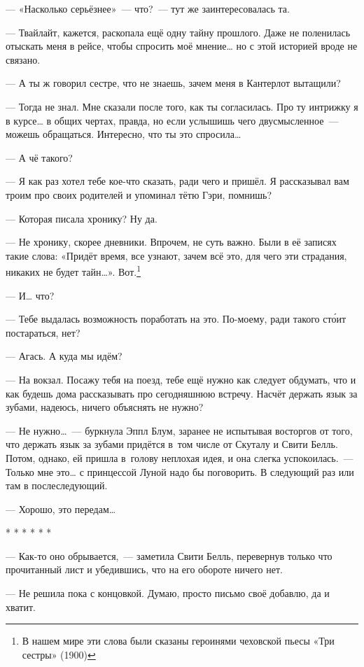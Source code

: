 \documentclass[fontsize=11pt,a5paper,titlepage=firstcover]{scrbook}
\begin{document}
--- «Насколько серьёзнее»~--- что?~--- тут же заинтересовалась та.

--- Твайлайт, кажется, раскопала ещё одну тайну прошлого. Даже не поленилась отыскать меня в рейсе, чтобы спросить моё мнение{\ldots} но с этой историей вроде не связано.

--- А ты ж говорил сестре, что не знаешь, зачем меня в Кантерлот вытащили?

--- Тогда не знал. Мне сказали после того, как ты согласилась. Про ту интрижку я в курсе{\ldots} в общих чертах, правда, но если услышишь чего двусмысленное~--- можешь обращаться. Интересно, что ты это спросила{\ldots}

--- А чё такого?

--- Я как раз хотел тебе кое-что сказать, ради чего и пришёл. Я рассказывал вам троим про своих родителей и упоминал тётю Гэри, помнишь?

--- Которая писала хронику? Ну да.

--- Не хронику, скорее дневники. Впрочем, не суть важно. Были в её записях такие слова: «Придёт время, все узнают, зачем всё это, для чего эти страдания, никаких не будет тайн…». Вот.\footnote{В нашем мире эти слова были сказаны героинями чеховской пьесы «Три сестры» (1900)}

--- И{\ldots} что?

--- Тебе выдалась возможность поработать на это. По-моему, ради такого сто́ит постараться, нет?

--- Агась. А куда мы идём?

--- На вокзал. Посажу тебя на поезд, тебе ещё нужно как следует обдумать, что и как будешь дома рассказывать про сегодняшнюю встречу. Насчёт держать язык за зубами, надеюсь, ничего объяснять не нужно?

--- Не нужно{\ldots}~--- буркнула Эппл Блум, заранее не испытывая восторгов от того, что держать язык за зубами придётся в~том числе от Скуталу и Свити Белль. Потом, однако, ей пришла в~голову неплохая идея, и она слегка успокоилась.~--- Только мне это{\ldots} с принцессой Луной надо бы поговорить. В следующий раз или там в послеследующий.

--- Хорошо, это передам{\ldots}
\begin{center}
	* * * * * *
\end{center}

--- Как-то оно обрывается,~--- заметила Свити Белль, перевернув только что прочитанный лист и убедившись, что на его обороте ничего нет.

--- Не решила пока с концовкой. Думаю, просто письмо своё добавлю, да и хватит.
\end{document}
